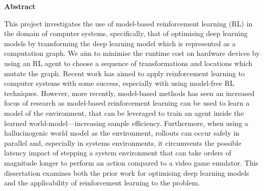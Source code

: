 \newpage
{\Huge \bf Abstract}
\vspace{24pt} 

This project investigates the use of model-based reinforcement learning (RL) in the domain of computer systems, specifically, that of optimising deep learning models by transforming the deep learning model which is represented as a computation graph. We aim to minimise the runtime cost on hardware devices by using an RL agent to choose a sequence of transformations and locations which mutate the graph. Recent work has aimed to apply reinforcement learning to computer systems with some success, especially with using model-free RL techniques. However, more recently, model-based methods has seen an increased focus of research as model-based reinforcement learning can be used to learn a model of the environment, that can be leveraged to train an agent inside the learned world-model---increasing sample efficiency. Furthermore, when using a hallucinogenic world model as the environment, rollouts can occur safely in parallel and, especially in systems environments, it circumvents the possible latency impact of stepping a system environment that can take orders of magnitude longer to perform an action compared to a video game emulator. This dissertation examines both the prior work for optimising deep learning models and the applicability of reinforcement learning to the problem.

\vspace*{\fill}
